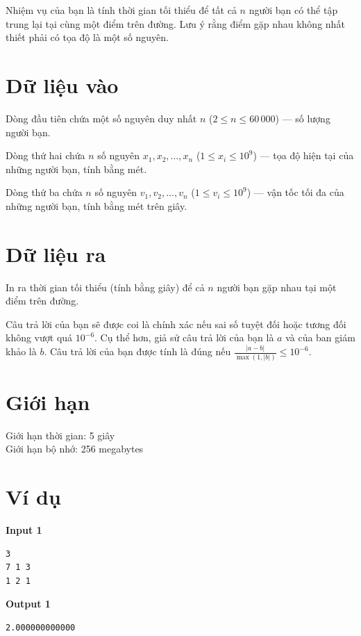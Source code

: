 \documentclass[12pt,a4paper]{article}
\begin{document}
Nhiệm vụ của bạn là tính thời gian tối thiểu để tất cả $n$ người bạn có thể tập trung lại tại cùng một điểm trên đường. Lưu ý rằng điểm gặp nhau không nhất thiết phải có tọa độ là một số nguyên.

\section*{Dữ liệu vào}
\begin{inputbox}
Dòng đầu tiên chứa một số nguyên duy nhất $n$ ($2 \le n \le 60\,000$) — số lượng người bạn.

Dòng thứ hai chứa $n$ số nguyên $x_1, x_2, \dots, x_n$ ($1 \le x_i \le 10^9$) — tọa độ hiện tại của những người bạn, tính bằng mét.

Dòng thứ ba chứa $n$ số nguyên $v_1, v_2, \dots, v_n$ ($1 \le v_i \le 10^9$) — vận tốc tối đa của những người bạn, tính bằng mét trên giây.
\end{inputbox}

\section*{Dữ liệu ra}
\begin{outputbox}
In ra thời gian tối thiểu (tính bằng giây) để cả $n$ người bạn gặp nhau tại một điểm trên đường.

Câu trả lời của bạn sẽ được coi là chính xác nếu sai số tuyệt đối hoặc tương đối không vượt quá $10^{-6}$. Cụ thể hơn, giả sử câu trả lời của bạn là $a$ và của ban giám khảo là $b$. Câu trả lời của bạn được tính là đúng nếu $\frac{|a - b|}{\max(1, |b|)} \le 10^{-6}$.
\end{outputbox}

\section*{Giới hạn}
\begin{constraintbox}
Giới hạn thời gian: 5 giây \\
Giới hạn bộ nhớ: 256 megabytes
\end{constraintbox}

\section*{Ví dụ}
\textbf{Input 1}
\begin{lstlisting}
3
7 1 3
1 2 1
\end{lstlisting}

\textbf{Output 1}
\begin{lstlisting}
2.000000000000
\end{lstlisting}
\end{document}
